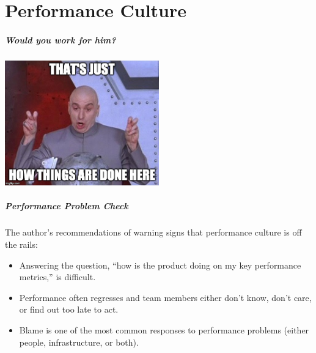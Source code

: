\part{Performance Culture}

\begin{frame}
\partpage
\end{frame}



\begin{frame}
\frametitle{Would you work for him?}

\begin{center}
	\includegraphics[width=0.5\textwidth]{images/drevil.jpg}
\end{center}

\end{frame}


\begin{frame}
\frametitle{Performance Problem Check}

The author's recommendations of warning signs that performance culture is off the rails:

\begin{itemize}
\item Answering the question, ``how is the product doing on my key performance metrics,'' is difficult.
\item Performance often regresses and team members either don't know, don't care, or find out too late to act.
\item Blame is one of the most common responses to performance problems (either people, infrastructure, or both).
\end{itemize}

\end{frame}


